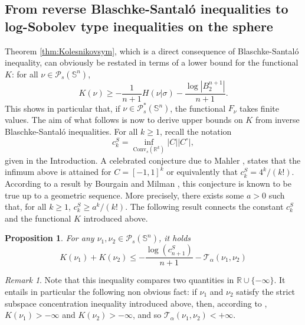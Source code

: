 \documentclass[10pt]{amsart}
\newtheorem{prop}[thm]{Proposition}
\theoremstyle{definition}
\theoremstyle{remark}
\newtheorem{rem}[thm]{Remark}
\newcommand{\R}{\mathbb{R}}
\newcommand{\Sd}{\mathbb{S}}
\begin{document}
\subsection{From reverse Blaschke-Santal\'o inequalities to log-Sobolev type inequalities on the sphere}
Theorem \ref{thm:Kolesnikovsym}, which is a direct consequence of Blaschke-Santal\'o inequality,  can obviously be restated in terms of a lower bound for the functional $K$: for all $\nu \in \mathcal{P}_s(\Sd^n)$, 
\[
K(\nu) \geq - \frac{1}{n+1}H(\nu|\sigma)-\frac{\log |B_2^{n+1}|}{n+1}.
\]
This shows in particular that, if $\nu \in \mathcal{P}_s^*(\Sd^n)$, the functional $F_\nu$ takes finite values. The aim of what follows is now to derive upper bounds on $K$ from inverse Blaschke-Santal\'o inequalities. For all $k \geq 1$, recall the notation
\[
c_k^S = \inf_{\mathrm{Conv}_s(\R^{k})} |C||C^\circ|,
\]
given in the Introduction.
A celebrated conjecture due to Mahler \cite{Mah39a,Mah39b}, states that the infimum above is attained for $C= [-1,1]^k$ or equivalently that $c_k^S= 4^k/(k!)$. According to a result by Bourgain and Milman \cite{bm87}, this conjecture is known to be true up to a geometric sequence. More precisely, there exists some $a>0$ such that, for all $k\geq 1$, $c_k^S \geq a^k/(k!).$ The following result connects the constant $c_k^S$ and the functional $K$ introduced above.

\begin{prop}\label{prop:KUB}
For any $\nu_1,\nu_2 \in \mathcal{P}_s(\Sd^n)$, it holds 
\begin{equation}\label{eq:KUB}
K(\nu_1)+K(\nu_2) \leq - \frac{\log\left(c_{n+1}^S\right)}{n+1}-\mathcal{T}_\alpha(\nu_1,\nu_2)
\end{equation}
\end{prop}
\begin{rem}\label{rem:Tfinite}
Note that this inequality compares two quantities in $\R\cup \{-\infty\}$. It entails in particular the following non obvious fact: if $\nu_1$ and $\nu_2$ satisfy the strict subspace concentration inequality introduced above, then, according to \cite[Theorem 6.3]{BLYZ13}, $K(\nu_1) >-\infty$ and $K(\nu_2)>-\infty$, and so $\mathcal{T}_\alpha(\nu_1,\nu_2)<+\infty$.
\end{rem}
\end{document}
